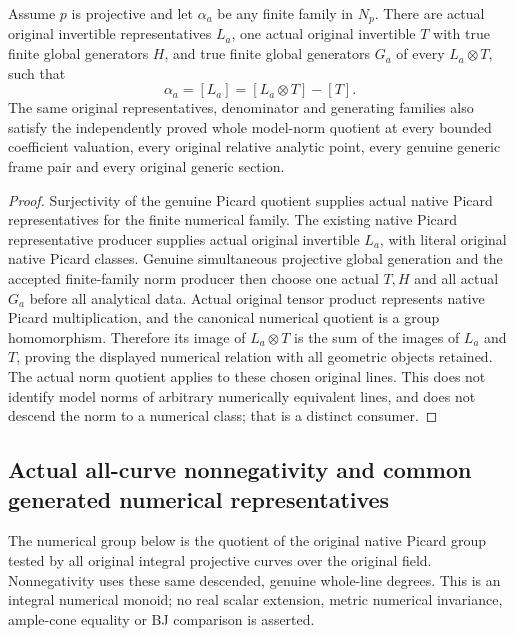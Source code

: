 \begin{theorem}
\label{thm:seven-native-numerical-common-generated-representatives}
\leanok
{}
Assume $p$ is projective and let $\alpha_a$ be any finite family in $N_p$.
There are actual original invertible representatives $L_a$, one actual
original invertible $T$ with true finite global generators $H$, and true
finite global generators $G_a$ of every $L_a\otimes T$, such that
\[
 \alpha_a=[L_a]=[L_a\otimes T]-[T].
\]
The same original representatives, denominator and generating families
also satisfy the independently proved whole model-norm quotient at every
bounded coefficient valuation, every original relative analytic point,
every genuine generic frame pair and every original generic section.
\end{theorem}
\begin{proof}
Surjectivity of the genuine Picard quotient supplies actual native Picard
representatives for the finite numerical family. The existing native
Picard representative producer supplies actual original invertible
$L_a$, with literal original native Picard classes. Genuine simultaneous
projective global generation and the accepted finite-family norm producer
then choose one actual $T,H$ and all actual $G_a$ before all analytical
data. Actual original tensor product represents native Picard
multiplication, and the canonical numerical quotient is a group
homomorphism. Therefore its image of $L_a\otimes T$ is the sum of the
images of $L_a$ and $T$, proving the displayed numerical relation with
all geometric objects retained. The actual norm quotient applies to
these chosen original lines. This does not identify model norms of
arbitrary numerically equivalent lines, and does not descend the norm
to a numerical class; that is a distinct consumer.
\end{proof}

\subsection{Actual all-curve nonnegativity and common generated numerical representatives}
The numerical group below is the quotient of the original native Picard
group tested by all original integral projective curves over the original
field. Nonnegativity uses these same descended, genuine whole-line degrees.
This is an integral numerical monoid; no real scalar extension, metric
numerical invariance, ample-cone equality or BJ comparison is asserted.

